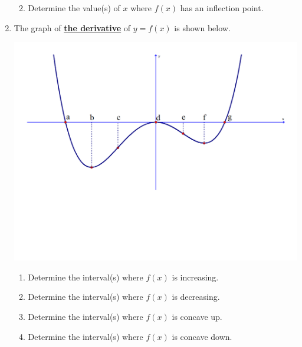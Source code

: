 \documentclass[12pt]{article}
\newif\ifans
\begin{document}
\begin{enumerate}
\begin{enumerate}
\ifans{\fbox{Relative max when $x=d$; Relative minima when $x=b$ and $x=f$}} \fi

\item Determine the value(s) of $x$ where $f(x)$ has an inflection point.

\ifans{\fbox{Point of Inflection when $x=c$ and $x=e$}} \fi

\end{enumerate}

\item The graph of \underline{\bf the derivative} of $y=f(x)$ is shown below.

\begin{center}
\includegraphics[scale=0.5]{graph.pdf}
\end{center}

\begin{enumerate}

\item Determine the interval(s) where $f(x)$ is increasing.

\ifans{\fbox{$(-\infty,a) \cup (g,\infty)$}} \fi

\item Determine the interval(s) where $f(x)$ is decreasing.

\ifans{\fbox{$(a,d) \cup (d,g)$}} \fi

\item Determine the interval(s) where $f(x)$ is concave up.

\ifans{\fbox{$(b,d) \cup (f,\infty)$}} \fi

\item Determine the interval(s) where $f(x)$ is concave down.


\end{enumerate}
\end{enumerate}
\end{document}
